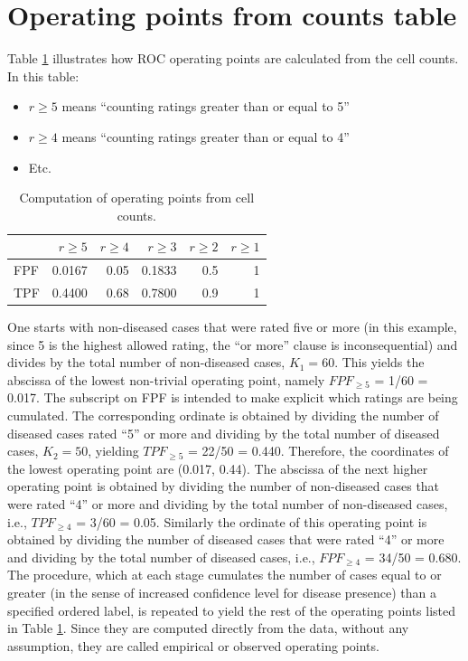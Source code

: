 \documentclass[
]{book}
\providecommand{\tightlist}{%
  \setlength{\itemsep}{0pt}\setlength{\parskip}{0pt}}
\begin{document}
\hypertarget{binary-task-operating-points-from-counts-table}{%
\section{Operating points from counts table}\label{binary-task-operating-points-from-counts-table}}

Table \ref{tab:ratings-paradigmTable2} illustrates how ROC operating points are calculated from the cell counts. In this table:

\begin{itemize}
\tightlist
\item
  \(r\geq 5\) means ``counting ratings greater than or equal to 5''
\item
  \(r\geq 4\) means ``counting ratings greater than or equal to 4''
\item
  Etc.
\end{itemize}

\begin{table}

\caption{\label{tab:ratings-paradigmTable2}Computation of operating points from cell counts.}
\centering
\begin{tabular}[t]{l|r|r|r|r|r}
\hline
  & $r\geq 5$ & $r\geq 4$ & $r\geq 3$ & $r\geq 2$ & $r\geq 1$\\
\hline
FPF & 0.0167 & 0.05 & 0.1833 & 0.5 & 1\\
\hline
TPF & 0.4400 & 0.68 & 0.7800 & 0.9 & 1\\
\hline
\end{tabular}
\end{table}

One starts with non-diseased cases that were rated five or more (in this example, since 5 is the highest allowed rating, the ``or more'' clause is inconsequential) and divides by the total number of non-diseased cases, \(K_1 = 60\). This yields the abscissa of the lowest non-trivial operating point, namely \(FPF_{\ge5}\) = 1/60 = 0.017. The subscript on FPF is intended to make explicit which ratings are being cumulated. The corresponding ordinate is obtained by dividing the number of diseased cases rated ``5'' or more and dividing by the total number of diseased cases, \(K_2 = 50\), yielding \(TPF_{\ge5}\) = 22/50 = 0.440. Therefore, the coordinates of the lowest operating point are (0.017, 0.44). The abscissa of the next higher operating point is obtained by dividing the number of non-diseased cases that were rated ``4'' or more and dividing by the total number of non-diseased cases, i.e., \(TPF_{\ge4}\) = 3/60 = 0.05. Similarly the ordinate of this operating point is obtained by dividing the number of diseased cases that were rated ``4'' or more and dividing by the total number of diseased cases, i.e., \(FPF_{\ge4}\) = 34/50 = 0.680. The procedure, which at each stage cumulates the number of cases equal to or greater (in the sense of increased confidence level for disease presence) than a specified ordered label, is repeated to yield the rest of the operating points listed in Table \ref{tab:ratings-paradigmTable2}. Since they are computed directly from the data, without any assumption, they are called empirical or observed operating points.
\end{document}
